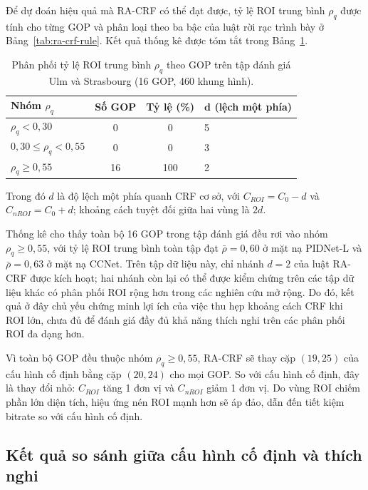 Để dự đoán hiệu quả mà RA-CRF có thể đạt được, tỷ lệ ROI trung bình $\rho_q$ được tính cho từng GOP và phân loại theo ba bậc của luật rời rạc trình bày ở Bảng~\ref{tab:ra-crf-rule}. Kết quả thống kê được tóm tắt trong Bảng~\ref{tab:rho-distribution}.

\begin{table}[H]
\centering
\caption{Phân phối tỷ lệ ROI trung bình $\rho_q$ theo GOP trên tập đánh giá Ulm và Strasbourg (16 GOP, 460 khung hình).}
\label{tab:rho-distribution}
\small
\begin{tabular}{p{}cc p{}}
\toprule
\textbf{Nhóm $\rho_q$} & \textbf{Số GOP} & \textbf{Tỷ lệ (\%)} & $\boldsymbol{d}$\textbf{ (lệch một phía)} \\
\midrule
$\rho_q < 0{,}30$ & 0 & 0 & 5 \\
$0{,}30 \leq \rho_q < 0{,}55$ & 0 & 0 & 3 \\
$\rho_q \geq 0{,}55$ & 16 & 100 & 2 \\
\bottomrule
\end{tabular}
\end{table}

Trong đó $d$ là độ lệch một phía quanh CRF cơ sở, với $C_{ROI}=C_0-d$ và $C_{nROI}=C_0+d$; khoảng cách tuyệt đối giữa hai vùng là $2d$.

Thống kê cho thấy toàn bộ 16 GOP trong tập đánh giá đều rơi vào nhóm $\rho_q \geq 0{,}55$, với tỷ lệ ROI trung bình toàn tập đạt $\bar{\rho}=0{,}60$ ở mặt nạ PIDNet-L và $\bar{\rho}=0{,}63$ ở mặt nạ CCNet. Trên tập dữ liệu này, chỉ nhánh $d=2$ của luật RA-CRF được kích hoạt; hai nhánh còn lại có thể được kiểm chứng trên các tập dữ liệu khác có phân phối ROI rộng hơn trong các nghiên cứu mở rộng. Do đó, kết quả ở đây chủ yếu chứng minh lợi ích của việc thu hẹp khoảng cách CRF khi ROI lớn, chưa đủ để đánh giá đầy đủ khả năng thích nghi trên các phân phối ROI đa dạng hơn.

Vì toàn bộ GOP đều thuộc nhóm $\rho_q \geq 0{,}55$, RA-CRF sẽ thay cặp $(19,25)$ của cấu hình cố định bằng cặp $(20,24)$ cho mọi GOP. So với cấu hình cố định, đây là thay đổi nhỏ: $C_{ROI}$ tăng 1 đơn vị và $C_{nROI}$ giảm 1 đơn vị. Do vùng ROI chiếm phần lớn diện tích, hiệu ứng nén ROI mạnh hơn sẽ áp đảo, dẫn đến tiết kiệm bitrate so với cấu hình cố định.

\subsection{Kết quả so sánh giữa cấu hình cố định và thích nghi}

